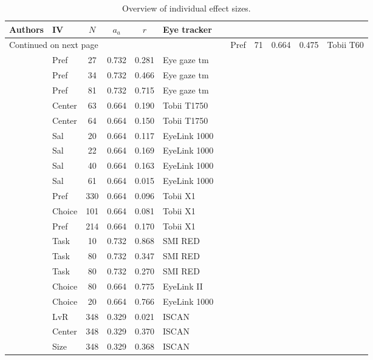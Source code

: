 \begin{longtable}{p{8cm}lcccl}
\caption{Overview of individual effect sizes.} \\ 
  \hline
Authors & IV & $N$ & $a_a$ & $r$ & Eye tracker \\ 
  \hline
\endhead
\hline
\multicolumn{7}{l}{\footnotesize Continued on next page}
\endfoot
\endlastfoot
 \hline
\cite{ares2014} & Pref & 71 & 0.664 & 0.475 & Tobii T60 \\ 
  \cite{ashby2015} & Pref & 27 & 0.732 & 0.281 & Eye gaze tm \\ 
  \cite{ashby2015} & Pref & 34 & 0.732 & 0.466 & Eye gaze tm \\ 
  \cite{ashby2015} & Pref & 81 & 0.732 & 0.715 & Eye gaze tm \\ 
  \cite{atalay2012a} & Center & 63 & 0.664 & 0.190 & Tobii T1750 \\ 
  \cite{atalay2012a} & Center & 64 & 0.664 & 0.150 & Tobii T1750 \\ 
  \cite{bagger2016} & Sal & 20 & 0.664 & 0.117 & EyeLink 1000 \\ 
  \cite{bagger2016} & Sal & 22 & 0.664 & 0.169 & EyeLink 1000 \\ 
  \cite{bagger2016} & Sal & 40 & 0.664 & 0.163 & EyeLink 1000 \\ 
  \cite{bagger2016} & Sal & 61 & 0.664 & 0.015 & EyeLink 1000 \\ 
  \cite{behe2014} & Pref & 330 & 0.664 & 0.096 & Tobii X1 \\ 
  \cite{behe2015} & Choice & 101 & 0.664 & 0.081 & Tobii X1 \\ 
  \cite{behe2017} & Pref & 214 & 0.664 & 0.170 & Tobii X1 \\ 
  \cite{bialkova2011} & Task & 10 & 0.732 & 0.868 & SMI RED \\ 
  \cite{bialkova2014a} & Task & 80 & 0.732 & 0.347 & SMI RED \\ 
  \cite{bialkova2014a} & Task & 80 & 0.732 & 0.270 & SMI RED \\ 
  \cite{brandstatter2014} & Choice & 80 & 0.664 & 0.775 & EyeLink II \\ 
  \cite{cavanagh2014} & Choice & 20 & 0.664 & 0.766 & EyeLink 1000 \\ 
  \cite{chandon2009a} & LvR & 348 & 0.329 & 0.021 & ISCAN \\ 
  \cite{chandon2009a} & Center & 348 & 0.329 & 0.370 & ISCAN \\ 
  \cite{chandon2009a} & Size & 348 & 0.329 & 0.368 & ISCAN \\ 

\end{longtable}
